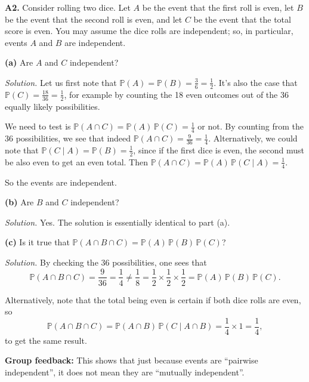 \documentclass[
  a4paper,
]{book}
\theoremstyle{definition}
\theoremstyle{definition}
\theoremstyle{definition}
\theoremstyle{definition}
\theoremstyle{remark}
\begin{document}
\textbf{A2.} Consider rolling two dice. Let \(A\) be the event that the first roll is even, let \(B\) be the event that the second roll is even, and let \(C\) be the event that the total score is even. You may assume the dice rolls are independent; so, in particular, events \(A\) and \(B\) are independent.

\textbf{(a)} Are \(A\) and \(C\) independent?

\begin{myanswers}
\emph{Solution.} Let us first note that \(\mathbb P(A) = \mathbb P(B) = \frac36 = \frac12\). It's also the case that \(\mathbb P(C) = \frac{18}{36} = \frac12\), for example by counting the 18 even outcomes out of the 36 equally likely possibilities.

We need to test is \(\mathbb P(A \cap C) = \mathbb P(A) \, \mathbb P(C) = \frac14\) or not. By counting from the 36 possibilities, we see that indeed \(\mathbb P(A \cap C) = \frac{9}{36} = \frac{1}{4}\). Alternatively, we could note that \(\mathbb P(C \mid A) = \mathbb P(B) = \frac12\), since if the first dice is even, the second must be also even to get an even total. Then \(\mathbb P(A \cap C) = \mathbb P(A) \, \mathbb P(C \mid A) = \frac14\).

So the events are independent.

\end{myanswers}

\textbf{(b)} Are \(B\) and \(C\) independent?

\begin{myanswers}
\emph{Solution.} Yes. The solution is essentially identical to part (a).

\end{myanswers}

\textbf{(c)} Is it true that \(\mathbb P(A \cap B \cap C) = \mathbb P(A) \, \mathbb P(B) \, \mathbb P(C)\)?

\begin{myanswers}
\emph{Solution.}
By checking the 36 possibilities, one sees that
\[ \mathbb P(A \cap B \cap C) = \frac{9}{36} = \frac{1}{4} \neq \frac{1}{8} = \frac12 \times \frac12 \times \frac12 = \mathbb P(A)\, \mathbb P(B) \, \mathbb P(C) . \]

Alternatively, note that the total being even is certain if both dice rolls are even, so
\[ \mathbb P(A \cap B \cap C) = \mathbb P(A \cap B) \, \mathbb P(C \mid A \cap B) = \frac14 \times 1 = \frac14 , \]
to get the same result.

\textbf{Group feedback:} This shows that just because events are ``pairwise independent'', it does not mean they are ``mutually independent''.

\end{myanswers}
\end{document}
